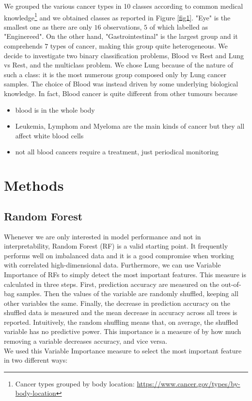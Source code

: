 \documentclass[a4paper,11pt, oneside]{article}  %
\begin{document}
We  grouped the various cancer types in 10 classes according to common medical knowledge\footnote{Cancer types grouped by body location: \url{https://www.cancer.gov/types/by-body-location}} and we obtained classes as reported in Figure \ref{fig1}.  "Eye" is the smallest one as there are only $16$ observations, $5$ of which labelled as "Enginereed". On the other hand, "Gastrointestinal" is the largest group and it comprehends $7$ types of cancer,  making this group quite heterogeneous.
We decide to investigate two binary classification problems,  Blood vs Rest and Lung vs Rest, and the multiclass problem. We chose Lung because of the nature of such a class: it is the most numerous group composed only by Lung cancer samples. The choice of Blood was instead driven by some underlying biological knowledge. In fact,  Blood cancer is quite different from other tumours because
\begin{itemize}
	\item blood is in the whole body
	\item Leukemia, Lymphom and Myeloma are the main kinds of cancer but they all affect white blood cells
	\item not all blood cancers require a treatment, just periodical monitoring
\end{itemize} 


\section{Methods}
\subsection{Random Forest}
Whenever we are only interested in model performance and not in interpretability, Random Forest (RF) is a valid starting point. It frequently performs well on imbalanced data and it is a good compromise when working with correlated high-dimensional data. Furthermore, we can use Variable Importance of RFs to simply detect the most important features. This measure is calculated in three steps. First, prediction accuracy are measured on the out-of-bag samples. Then the values of the variable are randomly shuffled, keeping all other variables the same. Finally, the decrease in prediction accuracy on the shuffled data is measured and the mean decrease in accuracy across all trees is reported. Intuitively, the random shuffling means that, on average, the shuffled variable has no predictive power. This importance is a measure of by how much removing a variable decreases accuracy, and vice versa. \\
We used this Variable Importance measure to select the most important feature in two different ways:
\end{document}

